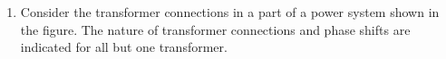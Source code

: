 \documentclass[a4paper,10pt]{exam}
\theoremstyle{remark}
\begin{document}
\begin{enumerate}
\begin{figure}[H]
\end{figure}
\begin{multicols}{4}
\begin{enumerate}
\item 0.6 W
\item 2.4 W
\item 4.2 W
\item 5.4 W
\end{enumerate}
\end{multicols}
\vfill
{}\\

\\
\newpage
\item 
Consider the transformer connections in a part of a power system shown in the figure. The nature of transformer connections and phase shifts are indicated for all but one transformer.\\


\end{enumerate}
\end{document}
